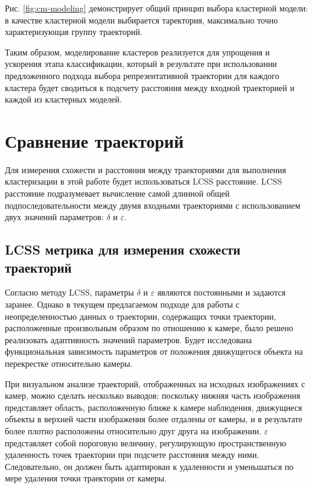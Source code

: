 Рис. \ref{fig:cm-modeling} демонстрирует общий принцип выбора кластерной модели: в качестве кластерной модели выбирается таректория, максимально точно характеризующая группу траекторий.


Таким образом, моделирование кластеров реализуется для упрощения и ускорения этапа классификации, который в результате при использовании предложенного подхода выбора репрезентативной траектории для каждого кластера будет сводиться к подсчету расстояния между входной траекторией и каждой из кластерных моделей.

\section{Сравнение траекторий}

Для измерения схожести и расстояния между траекториями для выполнения кластеризации в этой работе будет использоваться LCSS расстояние. LCSS расстояние подразумевает вычисление самой длинной общей подпоследовательности между двумя входными траекториями с использованием двух значений параметров: $\delta$ и $\varepsilon$.

\subsection{LCSS метрика для измерения схожести траекторий}

Согласно методу LCSS, параметры $\delta$ и $\varepsilon$ являются постоянными и задаются заранее. Однако в текущем предлагаемом подходе для работы с неопределенностью данных о траектории, содержащих точки траектории, расположенные произвольным образом по отношению к камере, было решено реализовать адаптивность значений параметров. Будет исследована функциональная зависимость параметров от положения движущегося объекта на перекрестке относительно камеры.

При визуальном анализе траекторий, отображенных на исходных изображениях с камер, можно сделать несколько выводов: поскольку нижняя часть изображения представляет область, расположенную ближе к камере наблюдения, движущиеся объекты в верхней части изображения более отдалены от камеры, и в результате более плотно расположены относительно друг друга на изображении. $\varepsilon$ представляет собой пороговую величину, регулирующую пространственную удаленность точек траектории при подсчете расстояния между ними. Следовательно, он должен быть адаптирован к удаленности и уменьшаться по мере удаления точки траектории от камеры.


